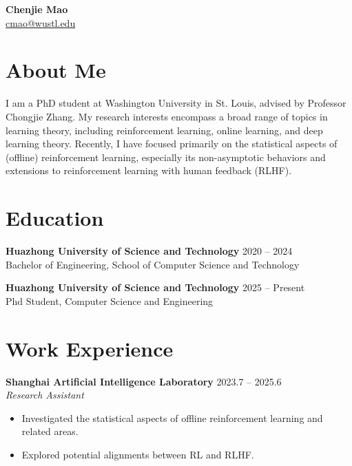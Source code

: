 \documentclass[11pt,a4paper]{article}
\begin{document}
\begin{center}
    {\Huge \bfseries Chenjie Mao} \\ \vspace{0.5em}
    \href{mailto:cmao@wustl.edu}{cmao@wustl.edu}
\end{center}

\vspace{1em}

\section*{About Me}
I am a PhD student at Washington University in St. Louis, advised by Professor Chongjie Zhang. My research interests encompass a broad range of topics in learning theory, including reinforcement learning, online learning, and deep learning theory. Recently, I have focused primarily on the statistical aspects of (offline) reinforcement learning, especially its non-asymptotic behaviors and extensions to reinforcement learning with human feedback (RLHF).

\section*{Education}
\textbf{Huazhong University of Science and Technology} \hfill 2020 -- 2024 \\
Bachelor of Engineering, School of Computer Science and Technology

\textbf{Huazhong University of Science and Technology} \hfill 2025 -- Present \\
Phd Student, Computer Science and Engineering

\section*{Work Experience}
\textbf{Shanghai Artificial Intelligence Laboratory} \hfill 2023.7 -- 2025.6 \\
\textit{Research Assistant}
\begin{itemize}[leftmargin=*, noitemsep, topsep=2pt]
    \item Investigated the statistical aspects of offline reinforcement learning and related areas.
    \item Explored potential alignments between RL and RLHF.
\end{itemize}

\end{document}
